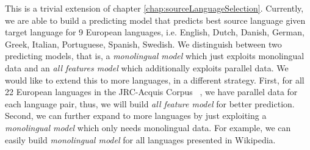 \begin{enumerate}
This is a trivial extension of chapter \ref{chap:sourceLanguageSelection}. Currently, we are able to build a predicting model that predicts best source language given target language for 9 European languages, i.e. English, Dutch, Danish, German, Greek, Italian, Portuguese, Spanish, Swedish. We distinguish between two predicting models, that is, a \emph{monolingual model} which just exploits monolingual data and an \emph{all features model} which additionally exploits parallel data. We would like to extend this to more languages, in a different strategy. First, for all 22 European languages in the JRC-Acquis Corpus ~\cite{SteinbergerAcquis}, we have parallel data for each language pair, thus, we will build \emph{all feature model} for better prediction. Second, we can further expand to more languages by just exploiting a \textit{monolingual model} which only needs monolingual data. For example, we can easily build \textit{monolingual model} for all languages presented in Wikipedia. 

\end{enumerate}

